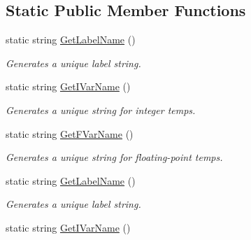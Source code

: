 \subsection*{Static Public Member Functions}
\begin{DoxyCompactItemize}
\item 
\hypertarget{classTAC__Generator_a1c93570d57d8b7bf249fa81563f856a4}{static string \hyperlink{classTAC__Generator_a1c93570d57d8b7bf249fa81563f856a4}{Get\-Label\-Name} ()}\label{classTAC__Generator_a1c93570d57d8b7bf249fa81563f856a4}

\begin{DoxyCompactList}\small\item\em Generates a unique label string. \end{DoxyCompactList}\item 
\hypertarget{classTAC__Generator_ae8cbc60e1fe0e103d9a80cea77a81ebc}{static string \hyperlink{classTAC__Generator_ae8cbc60e1fe0e103d9a80cea77a81ebc}{Get\-I\-Var\-Name} ()}\label{classTAC__Generator_ae8cbc60e1fe0e103d9a80cea77a81ebc}

\begin{DoxyCompactList}\small\item\em Generates a unique string for integer temps. \end{DoxyCompactList}\item 
\hypertarget{classTAC__Generator_a1b2b45bc25e804a732d46db8825e1304}{static string \hyperlink{classTAC__Generator_a1b2b45bc25e804a732d46db8825e1304}{Get\-F\-Var\-Name} ()}\label{classTAC__Generator_a1b2b45bc25e804a732d46db8825e1304}

\begin{DoxyCompactList}\small\item\em Generates a unique string for floating-\/point temps. \end{DoxyCompactList}\item 
\hypertarget{classTAC__Generator_a0d4dd38bfaa1a28fc615b81cbfd4efa1}{static string \hyperlink{classTAC__Generator_a0d4dd38bfaa1a28fc615b81cbfd4efa1}{Get\-Label\-Name} ()}\label{classTAC__Generator_a0d4dd38bfaa1a28fc615b81cbfd4efa1}

\begin{DoxyCompactList}\small\item\em Generates a unique label string. \end{DoxyCompactList}\item 
\hypertarget{classTAC__Generator_a7a604278c753cac6332ed772de9f12ea}{static string \hyperlink{classTAC__Generator_a7a604278c753cac6332ed772de9f12ea}{Get\-I\-Var\-Name} ()}\label{classTAC__Generator_a7a604278c753cac6332ed772de9f12ea}


\end{DoxyCompactItemize}
